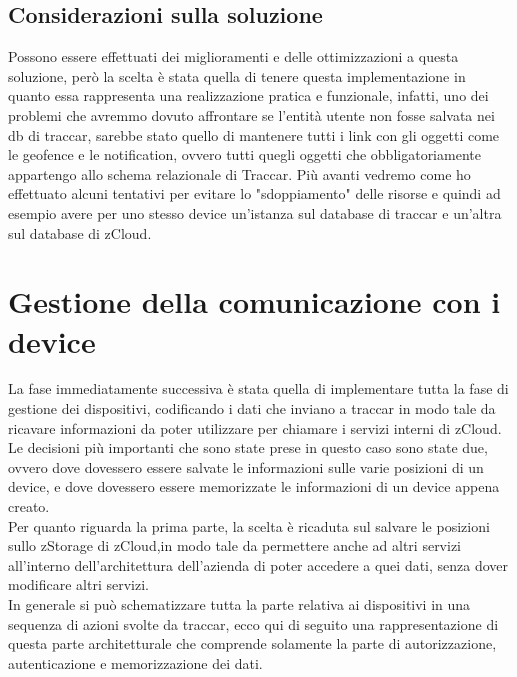 \documentclass[a4paper,titlepage,12pt]{book}
\begin{document}
\subsection{\sffamily
Considerazioni sulla soluzione}
Possono essere effettuati dei miglioramenti e delle ottimizzazioni a questa soluzione, però la scelta è stata quella di tenere questa implementazione in quanto essa rappresenta una realizzazione pratica e funzionale, infatti, uno dei problemi che avremmo dovuto affrontare se l'entità utente non fosse salvata nei db di traccar, sarebbe stato quello di mantenere tutti i link con gli oggetti come le geofence e le notification, ovvero tutti quegli oggetti che obbligatoriamente appartengo allo schema relazionale di Traccar. Più avanti vedremo come ho effettuato alcuni tentativi per evitare lo "sdoppiamento" delle risorse e quindi ad esempio avere per uno stesso device un'istanza sul database di traccar e un'altra sul database di zCloud.


\section{\sffamily
Gestione della comunicazione con i device}
La fase immediatamente successiva è stata quella di implementare tutta la fase di gestione dei dispositivi, codificando i dati che inviano a traccar in modo tale da ricavare informazioni da poter utilizzare per chiamare i servizi interni di zCloud. Le decisioni più importanti che sono state prese in questo caso sono state due, ovvero dove dovessero essere salvate le informazioni sulle varie posizioni di un device, e dove dovessero essere memorizzate le informazioni di un device appena creato. \\
Per quanto riguarda la prima parte, la scelta è ricaduta sul salvare le posizioni sullo zStorage di zCloud,in modo tale da permettere anche ad altri servizi all'interno dell'architettura dell'azienda di poter accedere a quei dati, senza dover modificare altri servizi.\\
In generale si può schematizzare tutta la parte relativa ai dispositivi in una sequenza di azioni svolte da traccar, ecco qui di seguito una rappresentazione di questa parte architetturale che comprende solamente la parte di autorizzazione, autenticazione e memorizzazione dei dati.
\end{document}
